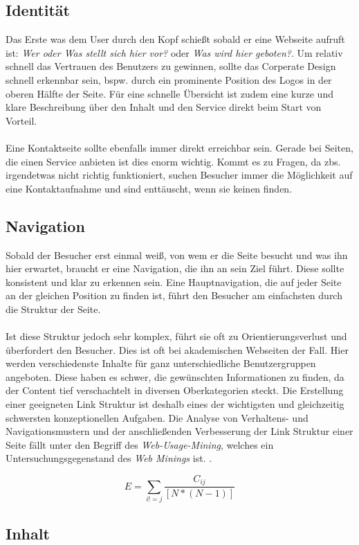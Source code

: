 \subsection{Identität}

Das Erste was dem User durch den Kopf schießt sobald er eine Webseite aufruft ist: \textit{\glqq Wer oder Was stellt sich hier vor?\grqq{}} oder \textit{\glqq Was wird hier geboten?\grqq{}}. Um relativ schnell das Vertrauen des Benutzers zu gewinnen, sollte das Corperate Design schnell erkennbar sein, bspw. durch ein prominente Position des Logos in der oberen Hälfte der Seite. Für eine schnelle Übersicht ist zudem eine kurze und klare Beschreibung über den Inhalt und den Service direkt beim Start von Vorteil.\\
\\
Eine Kontaktseite sollte ebenfalls immer direkt erreichbar sein. Gerade bei Seiten, die einen Service anbieten ist dies enorm wichtig. Kommt es zu Fragen, da zbs. irgendetwas nicht richtig funktioniert, suchen Besucher immer die Möglichkeit auf eine Kontaktaufnahme und sind enttäuscht, wenn sie keinen finden.


\subsection{Navigation}

Sobald der Besucher erst einmal weiß, von wem er die Seite besucht und was ihn hier erwartet, braucht er eine Navigation, die ihn an sein Ziel führt. Diese sollte konsistent und klar zu erkennen sein. Eine Hauptnavigation, die auf jeder Seite an der gleichen Position zu finden ist, führt den Besucher am einfachsten durch die Struktur der Seite.\\
\\
Ist diese Struktur jedoch sehr komplex, führt sie oft zu Orientierungsverlust und überfordert den Besucher. Dies ist oft bei akademischen Webseiten der Fall. Hier werden verschiedenste Inhalte für ganz unterschiedliche Benutzergruppen angeboten. Diese haben es schwer, die gewünschten Informationen zu finden, da der Content tief verschachtelt in diversen Oberkategorien steckt. Die Erstellung einer geeigneten Link Struktur ist deshalb eines der wichtigsten und gleichzeitig schwersten konzeptionellen Aufgaben. Die Analyse von Verhaltens- und Navigationsmustern und der anschließenden Verbesserung der Link Struktur einer Seite fällt unter den Begriff des \textit{Web-Usage-Mining}, welches ein Untersuchungsgegenstand des \textit{Web Minings} ist. \cite{webusagemining}.

\begin{equation}
    E = \sum_{i != j} \frac{C_{ij}}{[N * (N - 1)]}
    \label{connectivity}
\end{equation}

\subsection{Inhalt}








